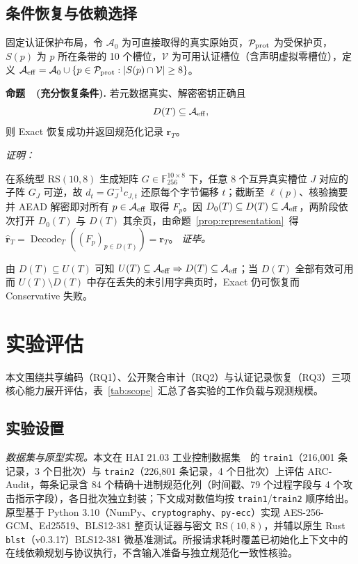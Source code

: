 \documentclass[10pt,journal]{IEEEtran}
\newcounter{proposition}
\newenvironment{proposition}[1]{%
  \refstepcounter{proposition}\par\smallskip\noindent
  \textbf{命题~\theproposition\ (#1). }\ignorespaces
}{\par\smallskip}
\newenvironment{claimproof}{\par\noindent\emph{证明：}\ignorespaces
}{\hfill\textit{证毕。}\par\smallskip}
\begin{document}
\subsection{条件恢复与依赖选择}\label{sec:recovery-condition}
固定认证保护布局，令 $\mathcal A_0$ 为可直接取得的真实原始页，$\mathcal P_{\rm prot}$ 为受保护页，$S(p)$ 为 $p$ 所在条带的 10 个槽位，$\mathcal V$ 为可用认证槽位（含声明虚拟零槽位），定义 $\mathcal A_{\rm eff}=\mathcal A_0\cup\{p\in\mathcal P_{\rm prot}:|S(p)\cap\mathcal V|\geq8\}$。

\begin{proposition}{充分恢复条件}\label{prop:recovery}
若元数据真实、解密密钥正确且
\begin{equation}\label{eq:recovery-condition}
D(T)\subseteq\mathcal A_{\rm eff},
\end{equation}
则 Exact 恢复成功并返回规范化记录 $\mathbf r_T$。
\end{proposition}
\begin{claimproof}
在系统型 RS$(10,8)$ 生成矩阵 $G\in\mathbb F_{256}^{10\times8}$ 下，任意 8 个互异真实槽位 $J$ 对应的子阵 $G_J$ 可逆，故 $d_t=G_J^{-1}c_{J,t}$ 还原每个字节偏移 $t$；截断至 $\ell(p)$、核验摘要并 AEAD 解密即对所有 $p\in\mathcal A_{\rm eff}$ 取得 $F_p$。因 $D_0(T)\subseteq D(T)\subseteq\mathcal A_{\rm eff}$，两阶段依次打开 $D_0(T)$ 与 $D(T)$ 其余页，由命题~\ref{prop:representation}~得 $\widehat{\mathbf r}_T=\operatorname{Decode}_T((F_p)_{p\in D(T)})=\mathbf r_T$。
\end{claimproof}
由 $D(T)\subseteq U(T)$ 可知 $U(T)\subseteq\mathcal A_{\rm eff}\Rightarrow D(T)\subseteq\mathcal A_{\rm eff}$；当 $D(T)$ 全部有效可用而 $U(T)\setminus D(T)$ 中存在丢失的未引用字典页时，Exact 仍可恢复而 Conservative 失败。

\section{实验评估}\label{sec:eval}
本文围绕共享编码（RQ1）、公开聚合审计（RQ2）与认证记录恢复（RQ3）三项核心能力展开评估，表~\ref{tab:scope}~汇总了各实验的工作负载与观测规模。

\subsection{实验设置}
\emph{数据集与原型实现。}本文在 HAI 21.03 工业控制数据集~\cite{Shin2021HAI}~的 \texttt{train1}（216,001 条记录，3 个日批次）与 \texttt{train2}（226,801 条记录，4 个日批次）上评估 ARC-Audit，每条记录含 84 个精确十进制规范化列（时间戳、79 个过程字段与 4 个攻击指示字段），各日批次独立封装；下文成对数值均按 \texttt{train1}/\texttt{train2} 顺序给出。原型基于 Python 3.10（NumPy、\texttt{cryptography}、\texttt{py-ecc}）实现 AES-256-GCM、Ed25519、BLS12-381 整页认证器与密文 RS$(10,8)$，并辅以原生 Rust \texttt{blst}（v0.3.17）BLS12-381 微基准测试。所报请求耗时覆盖已初始化上下文中的在线依赖规划与协议执行，不含输入准备与独立规范化一致性核验。
\end{document}
